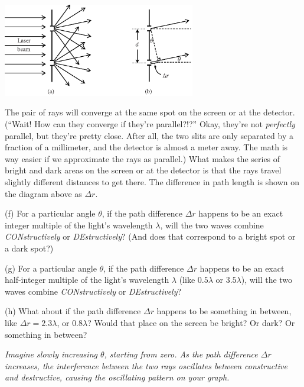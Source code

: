 \vspace{-0.2in}
\begin{center}
\includegraphics[width=0.63\textwidth]{interference_of_light/rays.eps}
\end{center}
\vspace{-0.2in}

The pair of rays will converge at the same spot on the screen or at the detector.  (``Wait!  How can they converge if they're parallel?!?''  Okay, they're not \textit{perfectly} parallel, but they're pretty close.  After all, the two slits are only separated by a fraction of a millimeter, and the detector is almost a meter away.  The math is way easier if we approximate the rays as parallel.)
What makes the series of bright and dark areas on the screen or at the detector is that the rays travel slightly different distances to get there.  
The difference in path length is shown on the diagram above as $\Delta r$.  

(f) For a particular angle $\theta$, if the path difference $\Delta r$ happens to be an exact integer multiple of the light's wavelength $\lambda$, will the two waves combine \textit{CONstructively} or \textit{DEstructively}?  (And does that correspond to a bright spot or a dark spot?)
\answerspace{0.5in}

(g) For a particular angle $\theta$, if the path difference $\Delta r$ happens to be an exact half-integer multiple of the light's wavelength $\lambda$ (like $0.5\lambda$ or $3.5\lambda$), will the two waves combine \textit{CONstructively} or \textit{DEstructively}?
\answerspace{0.5in}

(h) What about if the path difference $\Delta r$ happens to be something in between, like $\Delta r = 2.3\lambda$, or $0.8\lambda$? Would that place on the screen be bright? Or dark? Or something in between?
\answerspace{0.5in}

\textit{Imagine slowly increasing $\theta$, starting from zero.   As the path difference $\Delta r$ increases, the interference between the two rays oscillates between constructive and destructive, causing the oscillating pattern on your graph.}

